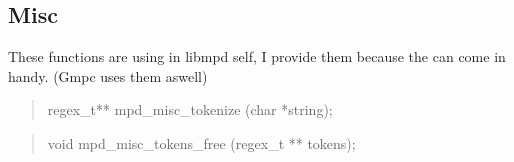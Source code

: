 \documentclass[a4paper,11pt]{article}
\begin{document}
\subsection{Misc}


These functions are using in libmpd self, I provide them because the can come in handy.
(Gmpc uses them aswell)

\begin{quote}
regex\_t** 	mpd\_misc\_tokenize			(char *string);
\end{quote}

\begin{quote}
void 		mpd\_misc\_tokens\_free			(regex\_t ** tokens);
\end{quote}
\end{document}
